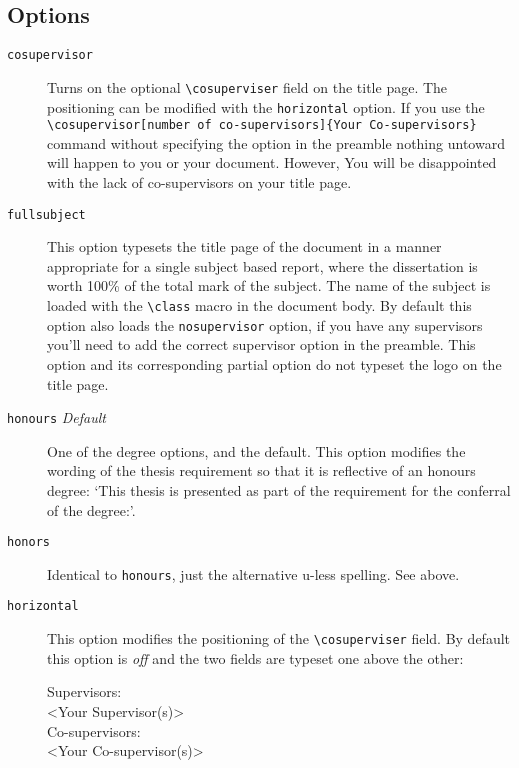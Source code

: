 \documentclass[12pt,oneside]{article}
\newcommand{\option}[1]{\texttt{\color{Green}#1}} %
\newcommand{\command}[1]{\texttt{\color{Red}#1}} %
\newcommand{\comoptions}[1]{\texttt{\color{Blue}#1}} %
\begin{document}
\subsection*{Options}
\begin{description}
    \item[\option{cosupervisor}] 
    Turns on the optional \command{\textbackslash{}cosuperviser} field on the title page. The positioning can be modified with the \option{horizontal} option. If you use the \command{\textbackslash{}cosupervisor}\option{[number of co-supervisors]}\comoptions{\{Your Co-supervisors\}} command without specifying the option in the preamble nothing untoward will happen to you or your document. However, You will be disappointed with the lack of co-supervisors on your title page.
    
    \item[\option{fullsubject}]
    This option typesets the title page of the document in a manner appropriate for a single subject based report, where the dissertation is worth 100\% of the total mark of the subject. The name of the subject is loaded with the \command{\textbackslash{}class} macro in the document body. By default this option also loads the \option{nosupervisor} option, if you have any supervisors you'll need to add the correct supervisor option in the preamble. This option and its corresponding partial option do not typeset the logo on the title page.
    
    \item[\option{honours} \emph{Default}]
    One of the degree options, and the default. This option modifies the wording of the thesis requirement so that it is reflective of an honours degree: `This thesis is presented as part of the requirement for the conferral of the degree:'.
    
    \item[\option{honors}]
    Identical to \option{honours}, just the alternative u-less spelling. See above.
    
    \item [\option{horizontal}]
    This option modifies the positioning of the \command{\textbackslash{}cosuperviser} field. By default this option is \emph{off} and the two fields are typeset one above the other:
    \begin{center}
        Supervisors:\\
        \textless{}Your Supervisor(s)\textgreater\\
        Co-supervisors:\\
        \textless{}Your Co-supervisor(s)\textgreater\\
    \end{center}
    

\end{description}
\end{document}
